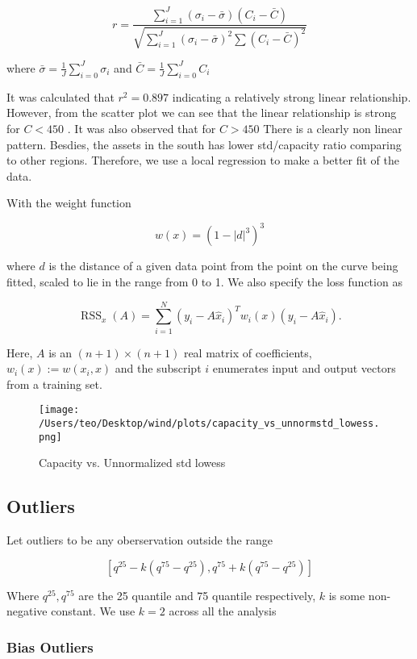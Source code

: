 \documentclass[
]{article}
\begin{document}
\[r=\frac{\sum_{i = 1}^J\left(\sigma_{i}-\bar{\sigma}\right)\left(C_{i}-\bar{C}\right)}{\sqrt{\sum_{i = 1}^J\left(\sigma_{i}-\bar{\sigma}\right)^{2} \sum\left(C_{i}-\bar{C}\right)^{2}}}\]

where \(\bar{\sigma} = \frac{1}{J} \sum_{i = 0}^J \sigma_i\) and
\(\bar{C} = \frac{1}{J} \sum_{i = 0}^J C_i\)

It was calculated that \(r^2 = 0.897\) indicating a relatively strong
linear relationship. However, from the scatter plot we can see that the
linear relationship is strong for \(C < 450\) . It was also observed
that for \(C>450\) There is a clearly non linear pattern. Besdies, the
assets in the south has lower std/capacity ratio comparing to other
regions. Therefore, we use a local regression to make a better fit of
the data.

With the weight function

\[w(x)=\left(1-|d|^{3}\right)^{3}\]

where \(d\) is the distance of a given data point from the point on the
curve being fitted, scaled to lie in the range from 0 to 1. We also
specify the loss function as

\[\operatorname{RSS}_{x}(A)=\sum_{i=1}^{N}\left(y_{i}-A \hat{x}_{i}\right)^{T} w_{i}(x)\left(y_{i}-A \hat{x}_{i}\right) .\]

Here, \(A\) is an \((n+1) \times(n+1)\) real matrix of coefficients,
\(w_{i}(x):=w\left(x_{i}, x\right)\) and the subscript \(i\) enumerates
input and output vectors from a training set.

\begin{figure}
\centering
\texttt{[image: /Users/teo/Desktop/wind/plots/capacity\_vs\_unnormstd\_lowess.png]}
\caption{Capacity vs. Unnormalized std lowess}
\end{figure}

\hypertarget{outliers}{%
\subsection{Outliers}\label{outliers}}

Let outliers to be any oberservation outside the range

\[\left[q^{25}-k\left(q^{75}-q^{25}\right), q^{75}+k\left(q^{75}-q^{25}\right)\right]\]

Where \(q^{25},q^{75}\) are the 25 quantile and 75 quantile
respectively, \(k\) is some non-negative constant. We use \(k=2\) across
all the analysis

\hypertarget{bias-outliers}{%
\subsubsection{Bias Outliers}\label{bias-outliers}}
\end{document}
